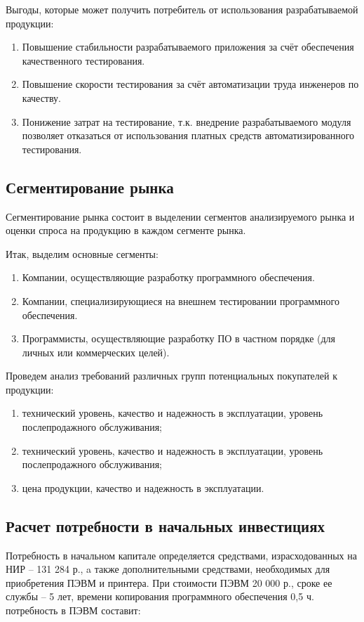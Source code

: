 Выгоды, которые может получить потребитель от использования разрабатываемой продукции:

\begin{enumerate}
\item Повышение стабильности разрабатываемого приложения за счёт обеспечения качественного тестирования.
\item Повышение скорости тестирования за счёт автоматизации труда инженеров по качеству.
\item Понижение затрат на тестирование, т.к. внедрение разрабатываемого модуля позволяет отказаться от
использования платных средств автоматизированного тестирования.
\end{enumerate}

\subsection{Сегментирование рынка}

Сегментирование рынка состоит в выделении сегментов анализируемого рынка и оценки спроса
на продукцию в каждом сегменте рынка.

Итак, выделим основные сегменты:
\begin{enumerate}
\item Компании, осуществляющие разработку программного обеспечения.
\item Компании, специализирующиеся на внешнем тестировании программного обеспечения.
\item Программисты, осуществляющие разработку ПО в частном порядке (для личных или коммерческих целей).
\end{enumerate}

Проведем анализ требований различных групп потенциальных покупателей к продукции:
\begin{enumerate}
\item технический уровень, качество и надежность в эксплуатации, уровень послепродажного обслуживания;
\item технический уровень, качество и надежность в эксплуатации, уровень послепродажного обслуживания;
\item цена продукции, качество и надежность в эксплуатации.
\end{enumerate}

\subsection{Расчет потребности в начальных инвестициях}

Потребность в начальном капитале определяется средствами, израсходованных на НИР – 131 284 р.,
a также дополнительными средствами, необходимых для приобретения ПЭВМ и принтера. При стоимости ПЭВМ 20 000 р.,
сроке ее службы – 5 лет, времени копирования программного обеспечения 0,5 ч. потребность в ПЭВМ составит: